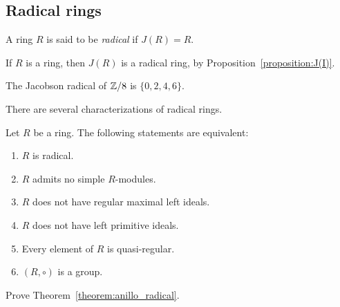\begin{optional}
\section{Radical rings} 

\begin{definition}
A ring $R$ is said to be \emph{radical} if $J(R)=R$. 
\end{definition}

\begin{example}
	If $R$ is a ring, then $J(R)$ is a radical ring, by Proposition~\ref{proposition:J(I)}.
\end{example}

\begin{example}
	The Jacobson radical of $\mathbb{Z}/8$ is $\{0,2,4,6\}$. 
\end{example}

There are several characterizations of radical rings. 

\begin{theorem}
	\label{theorem:anillo_radical}
	Let $R$ be a ring. The following statements are equivalent: 
	\begin{enumerate}
		\item $R$ is radical.
		\item $R$ admits no simple $R$-modules. 
		\item $R$ does not have regular maximal left ideals.
		\item $R$ does not have left primitive ideals.
		\item Every element of $R$ is quasi-regular. 
		\item $(R,\circ)$ is a group. 
	\end{enumerate}
\end{theorem}

\begin{xca}
    Prove Theorem~\ref{theorem:anillo_radical}. 
\end{xca}
%    
%
%	
%	
%


\end{optional}
